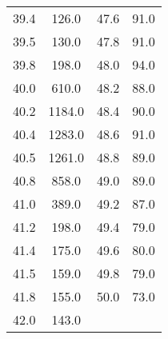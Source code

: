 \begin{table}[H]
\begin{tabular}{c c | c c }
        39.4  & 	126.0   & 47.6  &	91.0  \\
        39.5  & 	130.0   & 47.8  &	91.0  \\
        39.8  & 	198.0   & 48.0  &	94.0  \\
        40.0  & 	610.0   & 48.2  &	88.0  \\
        40.2  & 	1184.0  & 48.4  &	90.0  \\
        40.4  & 	1283.0  & 48.6  &	91.0  \\
        40.5  & 	1261.0  & 48.8  &	89.0  \\
        40.8  & 	858.0   & 49.0  &	89.0  \\
        41.0  & 	389.0   & 49.2  &	87.0  \\
        41.2  & 	198.0   & 49.4  &	79.0  \\
        41.4  & 	175.0   & 49.6  &	80.0  \\
        41.5  & 	159.0   & 49.8  &	79.0  \\
        41.8  & 	155.0   & 50.0  &	73.0  \\
        42.0  & 	143.0   &       &          \\                                                        
        \bottomrule
    \end{tabular}
\end{table}

